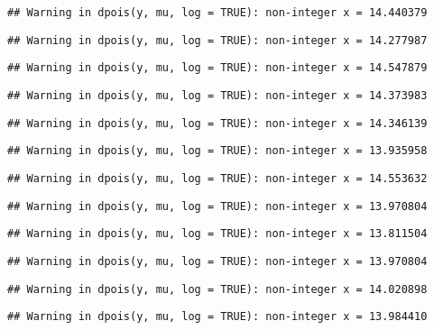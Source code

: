 \documentclass[
]{article}
\begin{document}
\begin{verbatim}
## Warning in dpois(y, mu, log = TRUE): non-integer x = 14.440379
\end{verbatim}

\begin{verbatim}
## Warning in dpois(y, mu, log = TRUE): non-integer x = 14.277987
\end{verbatim}

\begin{verbatim}
## Warning in dpois(y, mu, log = TRUE): non-integer x = 14.547879
\end{verbatim}

\begin{verbatim}
## Warning in dpois(y, mu, log = TRUE): non-integer x = 14.373983
\end{verbatim}

\begin{verbatim}
## Warning in dpois(y, mu, log = TRUE): non-integer x = 14.346139
\end{verbatim}

\begin{verbatim}
## Warning in dpois(y, mu, log = TRUE): non-integer x = 13.935958
\end{verbatim}

\begin{verbatim}
## Warning in dpois(y, mu, log = TRUE): non-integer x = 14.553632
\end{verbatim}

\begin{verbatim}
## Warning in dpois(y, mu, log = TRUE): non-integer x = 13.970804
\end{verbatim}

\begin{verbatim}
## Warning in dpois(y, mu, log = TRUE): non-integer x = 13.811504
\end{verbatim}

\begin{verbatim}
## Warning in dpois(y, mu, log = TRUE): non-integer x = 13.970804
\end{verbatim}

\begin{verbatim}
## Warning in dpois(y, mu, log = TRUE): non-integer x = 14.020898
\end{verbatim}

\begin{verbatim}
## Warning in dpois(y, mu, log = TRUE): non-integer x = 13.984410
\end{verbatim}
\end{document}
